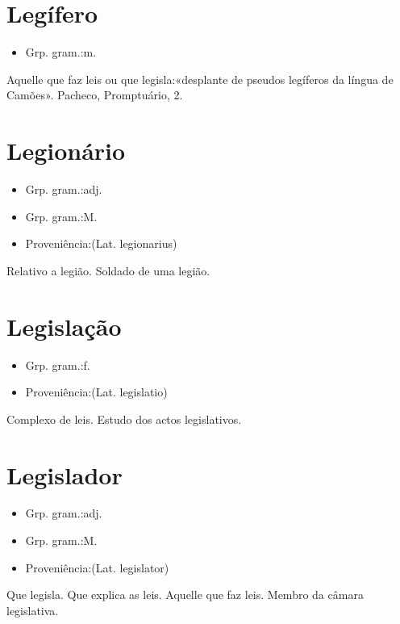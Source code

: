 \section{Legífero}
\begin{itemize}
\item {Grp. gram.:m.}
\end{itemize}
Aquelle que faz leis ou que legisla:«\textunderscore desplante de pseudos legíferos da língua de Camões\textunderscore ». Pacheco, \textunderscore Promptuário\textunderscore , 2.
\section{Legionário}
\begin{itemize}
\item {Grp. gram.:adj.}
\end{itemize}
\begin{itemize}
\item {Grp. gram.:M.}
\end{itemize}
\begin{itemize}
\item {Proveniência:(Lat. \textunderscore legionarius\textunderscore )}
\end{itemize}
Relativo a legião.
Soldado de uma legião.
\section{Legislação}
\begin{itemize}
\item {Grp. gram.:f.}
\end{itemize}
\begin{itemize}
\item {Proveniência:(Lat. \textunderscore legislatio\textunderscore )}
\end{itemize}
Complexo de leis.
Estudo dos actos legislativos.
\section{Legislador}
\begin{itemize}
\item {Grp. gram.:adj.}
\end{itemize}
\begin{itemize}
\item {Grp. gram.:M.}
\end{itemize}
\begin{itemize}
\item {Proveniência:(Lat. \textunderscore legislator\textunderscore )}
\end{itemize}
Que legisla.
Que explica as leis.
Aquelle que faz leis.
Membro da câmara legislativa.
